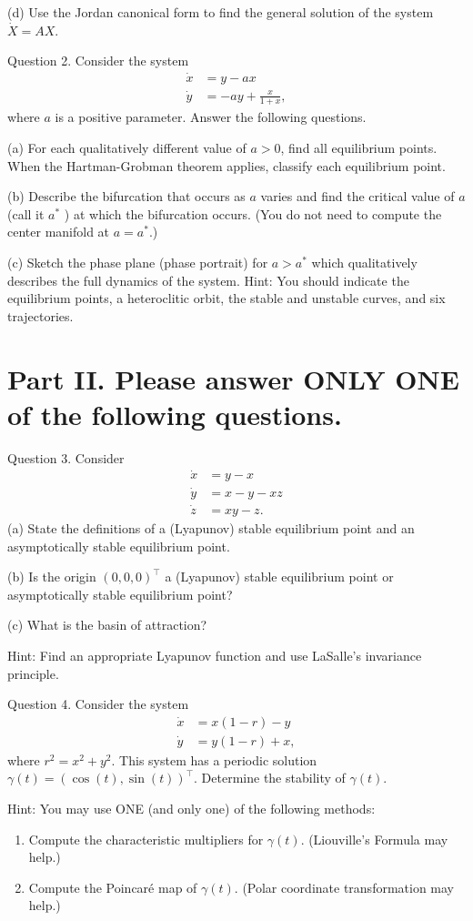 \documentclass[10pt]{article}
\begin{document}
(d) Use the Jordan canonical form to find the general solution of the system $\dot{X}=A X$.

Question 2. Consider the system
$$
\begin{aligned}
\dot{x} &=y-a x \\
\dot{y} &=-a y+\frac{x}{1+x},
\end{aligned}
$$
where $a$ is a positive parameter. Answer the following questions.

(a) For each qualitatively different value of $a>0$, find all equilibrium points. When the Hartman-Grobman theorem applies, classify each equilibrium point.

(b) Describe the bifurcation that occurs as $a$ varies and find the critical value of $a$ (call it $a^{*}$ ) at which the bifurcation occurs. (You do not need to compute the center manifold at $a=a^{*}$.)

(c) Sketch the phase plane (phase portrait) for $a>a^{*}$ which qualitatively describes the full dynamics of the system. Hint: You should indicate the equilibrium points, a heteroclitic orbit, the stable and unstable curves, and six trajectories.

\section{Part II. Please answer ONLY ONE of the following questions.}
Question 3. Consider
$$
\begin{aligned}
\dot{x} &=y-x \\
\dot{y} &=x-y-x z \\
\dot{z} &=x y-z .
\end{aligned}
$$
(a) State the definitions of a (Lyapunov) stable equilibrium point and an asymptotically stable equilibrium point.

(b) Is the origin $(0,0,0)^{\top}$ a (Lyapunov) stable equilibrium point or asymptotically stable equilibrium point?

(c) What is the basin of attraction?

Hint: Find an appropriate Lyapunov function and use LaSalle's invariance principle.

Question 4. Consider the system
$$
\begin{aligned}
\dot{x} &=x(1-r)-y \\
\dot{y} &=y(1-r)+x,
\end{aligned}
$$
where $r^{2}=x^{2}+y^{2}$. This system has a periodic solution $\gamma(t)=(\cos (t), \sin (t))^{\top}$. Determine the stability of $\gamma(t)$.

Hint: You may use ONE (and only one) of the following methods:

\begin{enumerate}
  \item Compute the characteristic multipliers for $\gamma(t)$. (Liouville's Formula may help.)

  \item Compute the Poincaré map of $\gamma(t)$. (Polar coordinate transformation may help.)

\end{enumerate}
\end{document}
